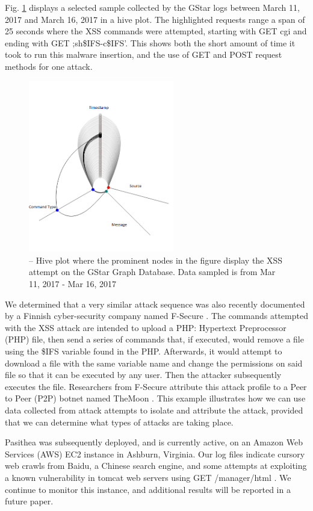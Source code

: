 \noindent Fig. \ref{fig:XSS} displays a selected sample collected by the GStar logs between March 11, 2017 and March 16, 2017 in a hive plot. The highlighted requests range a span of 25 seconds where the XSS commands were attempted, starting with GET cgi and ending with GET ;sh\$IFS-c\$IFS'. This shows both the short amount of time it took to run this malware insertion, and the use of GET and POST request methods for one attack.

\begin{figure}[h]
\centering
\includegraphics[width=2.5in]{images/XSS.png} 
\caption{-- Hive plot where the prominent nodes in the figure display the XSS attempt on the GStar Graph Database. Data sampled is from Mar 11, 2017 - Mar 16, 2017}
\label{fig:XSS}
\end{figure}

We determined that a very similar attack sequence was also recently documented by a Finnish cyber-security company named F-Secure \cite{F-Secure}. The commands attempted with the XSS attack are intended to upload a PHP: Hypertext Preprocessor (PHP) file, then send a series of commands that, if executed, would remove a file using the \$IFS variable found in the PHP. Afterwards, it would attempt to download a file with the same variable name and change the permissions on said file so that it can be executed by any user.  Then the attacker subsequently executes the file. Researchers from F-Secure  attribute this attack profile to a Peer to Peer (P2P) botnet named TheMoon \cite{TheMoon}. This example illustrates how we can use data collected from attack attempts to isolate and attribute the attack, provided that we can determine what types of attacks are taking place.

Pasithea was subsequently deployed, and is currently active, on an Amazon Web Services (AWS) EC2 instance in Ashburn, Virginia. Our log files indicate cursory web crawls from Baidu, a Chinese search engine, and some attempts at exploiting a known vulnerability in tomcat web servers using GET /manager/html \cite{Tomcat-Exploit}. We continue to monitor this instance, and additional results will be reported in a future paper.
